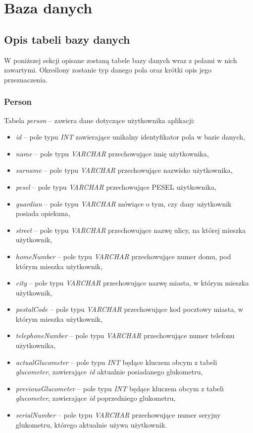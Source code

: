 \chapter{Baza danych}

\section{Opis tabeli bazy danych}
W poniższej sekcji opisane zostaną tabele bazy danych wraz z polami w nich zawartymi. Określony zostanie typ danego pola oraz krótki opis jego przeznaczenia. 

\subsection{Person}
Tabela \textit{person} -- zawiera dane dotyczące użytkownika aplikacji:
\begin{itemize}
	\item \textit{id} -- pole typu \textit{INT} zawierające unikalny identyfikator pola w bazie danych,
	\item \textit{name} -- pole typu \textit{VARCHAR} przechowujące imię użytkownika,
	\item \textit{surname} -- pole typu \textit{VARCHAR}  przechowujące nazwisko użytkownika,
	\item \textit{pesel} -- pole typu \textit{VARCHAR} przechowujące PESEL użytkownika,
	\item \textit{guardian} -- pole typu \textit{VARCHAR} mówiące o tym, czy dany użytkownik posiada opiekuna,
	\item \textit{street} -- pole typu \textit{VARCHAR} przechowujące nazwę ulicy, na której mieszka użytkownik,
	\item \textit{homeNumber} -- pole typu \textit{VARCHAR} przechowujące numer domu, pod którym mieszka użytkownik,
	\item \textit{city} -- pole typu \textit{VARCHAR} przechowujące nazwę miasta, w którym mieszka użytkownik,
	\item \textit{postalCode} -- pole typu \textit{VARCHAR} przechowujące kod pocztowy miasta, w którym mieszka użytkownik,
	\item \textit{telephoneNumber} -- pole typu \textit{VARCHAR} przechowujące numer telefonu użytkownika,
	\item \textit{actualGlucometer} -- pole typu \textit{INT} będące kluczem obcym z tabeli \textit{glucometer}, zawierające \textit{id} aktualnie posiadanego glukometru,
	\item \textit{previousGlucometer} -- pole typu \textit{INT} będące kluczem obcym z tabeli \textit{glucometer}, zawierające \textit{id} poprzedniego glukometru,
	\item \textit{serialNumber} -- pole typu \textit{VARCHAR} przechowujące numer seryjny glukometru, którego aktualnie używa użytkownik.
\end{itemize}

